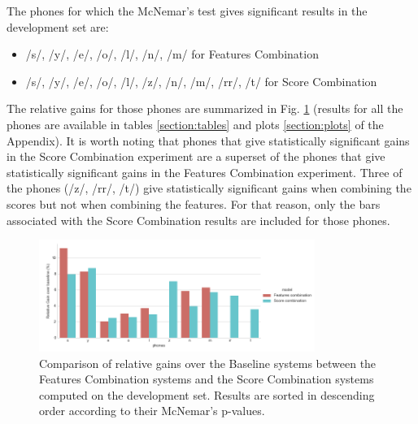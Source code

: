 The phones for which the McNemar's test gives significant results
in the development set are:

\begin{itemize}
	\item /s/, /y/, /e/, /o/, /l/, /n/, /m/ for Features Combination
	\item /s/, /y/, /e/, /o/, /l/, /z/, /n/, /m/, /rr/, /t/ for Score Combination
\end{itemize}

The relative gains for those phones are summarized in
Fig. \ref{fig:fusionMcnemarDev} (results for all the phones are available
in tables \ref{section:tables} and plots \ref{section:plots} of the
Appendix). It is worth noting that phones that
give statistically significant gains in
the Score Combination experiment are a superset of the phones that give statistically
significant gains in the Features Combination experiment.
Three of the phones (/z/, /rr/, /t/) give statistically significant gains
when combining the scores but not when combining the features.
For that reason, only the bars associated with the Score Combination results are
included for those phones.

\begin{figure}[H]
	\centering
	\includegraphics[width=0.8\textwidth]{files/figures/results/relatives/relatives-fusion-systems-dev-mcnemar.png}
	\caption{Comparison of relative gains over the Baseline systems
	between the Features Combination systems
	and the Score Combination systems
	computed on the development set.
	Results are sorted in descending order according to their McNemar's p-values.}
	\label{fig:fusionMcnemarDev}
\end{figure}

